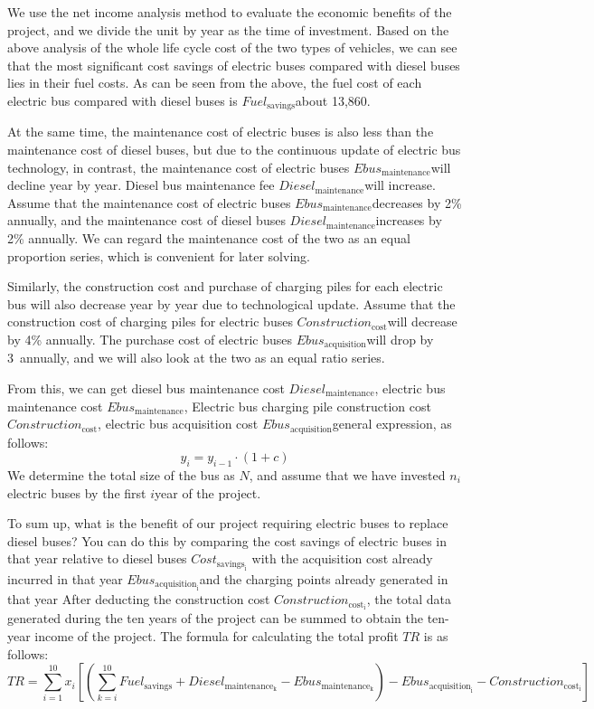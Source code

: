 \documentclass[12pt]{article}
\begin{document}
We use the net income analysis method to evaluate the economic benefits of the project, and we divide the unit by year as the time of 
investment. Based on the above analysis of the whole life cycle cost of the two types of vehicles, we can see that the most significant 
cost savings of electric buses compared with diesel buses lies in their fuel costs. As can be seen from the above, the fuel cost of 
each electric bus compared with diesel buses is $Fuel_{\text{savings}}$about 13,860.

At the same time, the maintenance cost of electric buses is also less than the maintenance cost of diesel buses, but due to the 
continuous update of electric bus technology, in contrast, the maintenance cost of electric buses $Ebus_{\text{maintenance}}$will 
decline year by year. Diesel bus maintenance fee $Diesel_{\text{maintenance}}$will increase. Assume that the maintenance cost of 
electric buses $Ebus_{\text{maintenance}}$decreases by 2\% annually, and the maintenance cost of diesel buses $Diesel_{\text{maintenance}}$increases by 2\% annually. We can regard the maintenance cost of the two as an equal proportion series, which is convenient for later solving.

Similarly, the construction cost and purchase of charging piles for each electric bus will also decrease year by year due to 
technological update. Assume that the construction cost of charging piles for electric buses $Construction_{\text{cost}}$will 
decrease by 4\% annually. The purchase cost of electric buses $Ebus_{\text{acquisition}}$will drop by 3\ annually, and we will 
also look at the two as an equal ratio series.

From this, we can get diesel bus maintenance cost $Diesel_{\text{maintenance}}$, electric bus maintenance 
cost $Ebus_{\text{maintenance}}$, Electric bus charging pile construction cost $Construction_{\text{cost}}$, 
electric bus acquisition cost $Ebus_{\text{acquisition}}$general expression, as follows:
\begin{equation}
    y_i=y_{i-1} \cdot (1+c)
\end{equation}
We determine the total size of the bus as $N$, and assume that we have invested $n_i$ electric buses by the first $i$year of the 
project.

To sum up, what is the benefit of our project requiring electric buses to replace diesel buses? You can do this by comparing the 
cost savings of electric buses in that year relative to diesel buses $Cost_{{\text{savings}}_{\text{i}}}$ with the acquisition cost 
already incurred in that year $Ebus_{{\text{acquisition}}_{\text{i}}}$and the charging points already generated in that year After 
deducting the construction cost $Construction_{{\text{cost}}_{\text{i}}}$, the total data generated during the ten years of the project 
can be summed to obtain the ten-year income of the project. The formula for calculating the total profit $TR$ is as follows:
\begin{equation}
    TR=\sum_{i=1}^{10} x_i[(\sum_{k=i}^{10} Fuel_{\text{savings}}+Diesel_{\text{maintenance}_{\text{k}}}-Ebus_{\text{maintenance}_{\text{k}}})-Ebus_{\text{acquisition}_{\text{i}}}-Construction_{{\text{cost}}_{\text{i}}}]
\end{equation}
\end{document}
